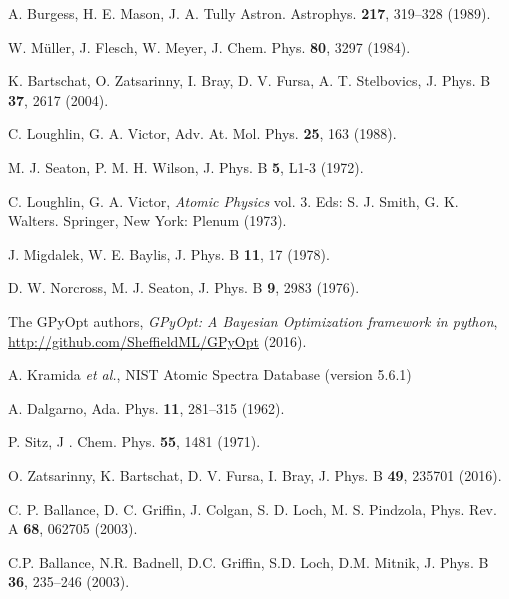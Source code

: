 \begin{thebibliography}{9}
A. Burgess, H. E. Mason, J. A. Tully
Astron. Astrophys. \textbf{217}, 319--328 (1989).

W. M\"uller, J. Flesch, W. Meyer,
J. Chem. Phys. \textbf{80}, 3297 (1984).

K. Bartschat, O. Zatsarinny, I. Bray, D. V. Fursa, A. T. Stelbovics,
J. Phys. B \textbf{37}, 2617 (2004).

C. Loughlin, G. A. Victor,
Adv. At. Mol. Phys. \textbf{25}, 163 (1988).

M. J. Seaton, P. M. H. Wilson,
J. Phys. B \textbf{5}, L1-3 (1972).

C. Loughlin, G. A. Victor,
\textit{Atomic Physics} vol. 3. 
Eds: S. J. Smith, G. K. Walters.
Springer, New York: Plenum (1973).

J. Migdalek, W. E. Baylis,
J. Phys. B \textbf{11}, 17 (1978).

D. W. Norcross, M. J. Seaton,
J. Phys. B \textbf{9}, 2983 (1976).

The GPyOpt authors,
\textit{GPyOpt: A Bayesian Optimization framework in python},
\url{http://github.com/SheffieldML/GPyOpt} (2016).

A. Kramida \textit{et al.},
NIST Atomic Spectra Database (version 5.6.1) 

A. Dalgarno,
Ada. Phys. \textbf{11}, 281--315 (1962).

P. Sitz, 
J . Chem. Phys. \textbf{55}, 1481 (1971).


O. Zatsarinny, K. Bartschat, D. V. Fursa, I. Bray,
J. Phys. B \textbf{49}, 235701 (2016).

C. P. Ballance, D. C. Griffin, J. Colgan, S. D. Loch, M. S. Pindzola,
Phys. Rev. A \textbf{68}, 062705 (2003).


C.P. Ballance, N.R. Badnell, D.C. Griffin, S.D. Loch, D.M. Mitnik, 
J. Phys. B \textbf{36}, 235--246 (2003).


\end{thebibliography}
